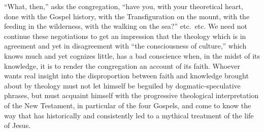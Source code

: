\documentclass[12pt]{book}
\begin{document}
``What, then,'' asks the congregation, ``have you, with your theoretical heart, done with the Gospel history, with the Transfiguration on the mount, with the feeding in the wilderness, with the walking on the sea?'' etc.\ etc. We need not continue these negotiations to get an impression that the theology which is in agreement and yet in disagreement with ``the consciousness of culture,'' which knows much and yet cognizes little, has a bad conscience when, in the midst of its knowledge, it is to render the congregation an account of its faith. Whoever wants real insight into the disproportion between faith and knowledge brought about by theology must not let himself be beguiled by dogmatic-speculative phrases, but must acquaint himself with the progressive theological interpretation of the New Testament, in particular of the four Gospels, and come to know the way that has historically and consistently led to a mythical treatment of the life of Jesus.
\end{document}
